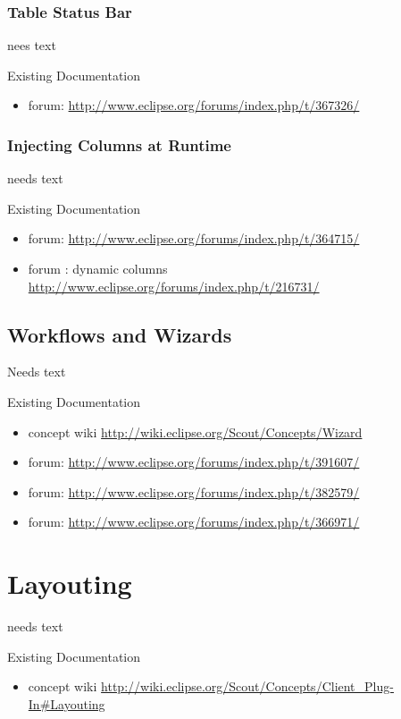 \documentclass[a4paper,10pt,twoside]{book}
\begin{document}
\subsection{Table Status Bar}
nees text

\noindent Existing Documentation
\begin{itemize}
  \item forum: \url{http://www.eclipse.org/forums/index.php/t/367326/}
\end{itemize}

\subsection{Injecting Columns at Runtime}
needs text

\noindent Existing Documentation
\begin{itemize}
  \item forum: \url{http://www.eclipse.org/forums/index.php/t/364715/}
  \item forum : dynamic columns \url{http://www.eclipse.org/forums/index.php/t/216731/}
\end{itemize}

\section{Workflows and Wizards}
Needs text

\noindent Existing Documentation
\begin{itemize}
  \item concept wiki \url{http://wiki.eclipse.org/Scout/Concepts/Wizard}
  \item forum: \url{http://www.eclipse.org/forums/index.php/t/391607/}
  \item forum: \url{http://www.eclipse.org/forums/index.php/t/382579/}
  \item forum: \url{http://www.eclipse.org/forums/index.php/t/366971/}
\end{itemize}




\chapter{Layouting}
needs text

\noindent Existing Documentation
\begin{itemize}
  \item concept wiki \url{http://wiki.eclipse.org/Scout/Concepts/Client_Plug-In#Layouting}
\end{itemize}
\end{document}
